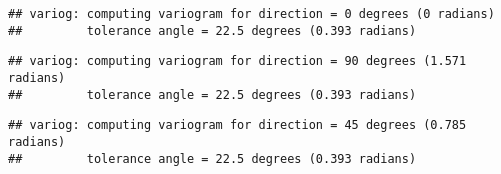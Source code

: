 \documentclass[
  12pt,
]{article}
\newenvironment{Shaded}{\begin{snugshade}}{\end{snugshade}}
\newcommand{\AttributeTok}[1]{\textcolor[rgb]{0.77,0.63,0.00}{#1}}
\newcommand{\DecValTok}[1]{\textcolor[rgb]{0.00,0.00,0.81}{#1}}
\newcommand{\FloatTok}[1]{\textcolor[rgb]{0.00,0.00,0.81}{#1}}
\newcommand{\FunctionTok}[1]{\textcolor[rgb]{0.00,0.00,0.00}{#1}}
\newcommand{\NormalTok}[1]{#1}
\newcommand{\OtherTok}[1]{\textcolor[rgb]{0.56,0.35,0.01}{#1}}
\newcommand{\SpecialCharTok}[1]{\textcolor[rgb]{0.00,0.00,0.00}{#1}}
\begin{document}
\begin{verbatim}
## variog: computing variogram for direction = 0 degrees (0 radians)
##         tolerance angle = 22.5 degrees (0.393 radians)
\end{verbatim}

\begin{Shaded}
\end{Shaded}

\begin{verbatim}
## variog: computing variogram for direction = 90 degrees (1.571 radians)
##         tolerance angle = 22.5 degrees (0.393 radians)
\end{verbatim}

\begin{Shaded}
\end{Shaded}

\begin{verbatim}
## variog: computing variogram for direction = 45 degrees (0.785 radians)
##         tolerance angle = 22.5 degrees (0.393 radians)
\end{verbatim}
\end{document}
